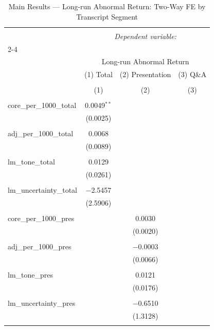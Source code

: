 
\begin{table}[!htbp] \centering 
  \caption{Main Results — Long-run Abnormal Return: Two-Way FE by Transcript Segment} 
  \label{} 
\begin{tabular}{@{\extracolsep{5pt}}lccc} 
\\[-1.8ex]\hline 
\hline \\[-1.8ex] 
 & \multicolumn{3}{c}{\textit{Dependent variable:}} \\ 
\cline{2-4} 
\\[-1.8ex] & \multicolumn{3}{c}{Long-run Abnormal Return} \\ 
 & (1) Total & (2) Presentation & (3) Q\&A \\ 
\\[-1.8ex] & (1) & (2) & (3)\\ 
\hline \\[-1.8ex] 
 core\_per\_1000\_total & 0.0049$^{**}$ &  &  \\ 
  & (0.0025) &  &  \\ 
  & & & \\ 
 adj\_per\_1000\_total & 0.0068 &  &  \\ 
  & (0.0089) &  &  \\ 
  & & & \\ 
 lm\_tone\_total & 0.0129 &  &  \\ 
  & (0.0261) &  &  \\ 
  & & & \\ 
 lm\_uncertainty\_total & $-$2.5457 &  &  \\ 
  & (2.5906) &  &  \\ 
  & & & \\ 
 core\_per\_1000\_pres &  & 0.0030 &  \\ 
  &  & (0.0020) &  \\ 
  & & & \\ 
 adj\_per\_1000\_pres &  & $-$0.0003 &  \\ 
  &  & (0.0066) &  \\ 
  & & & \\ 
 lm\_tone\_pres &  & 0.0121 &  \\ 
  &  & (0.0176) &  \\ 
  & & & \\ 
 lm\_uncertainty\_pres &  & $-$0.6510 &  \\ 
  &  & (1.3128) &  \\ 
  & & & \\ 

\end{tabular}
\end{table}
